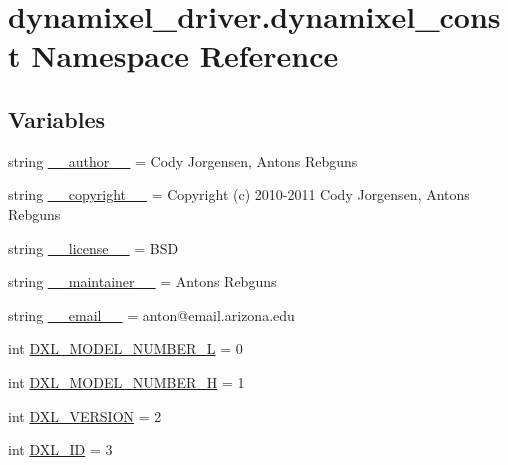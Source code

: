 \hypertarget{namespacedynamixel__driver_1_1dynamixel__const}{}\section{dynamixel\+\_\+driver.\+dynamixel\+\_\+const Namespace Reference}
\label{namespacedynamixel__driver_1_1dynamixel__const}
\subsection*{Variables}
\begin{DoxyCompactItemize}
\item 
string \hyperlink{namespacedynamixel__driver_1_1dynamixel__const_a47fdd52e119bdcded6911b8862d0012c}{\+\_\+\+\_\+author\+\_\+\+\_\+} = \textquotesingle{}Cody Jorgensen, Antons Rebguns\textquotesingle{}
\item 
string \hyperlink{namespacedynamixel__driver_1_1dynamixel__const_a718f3c8c96f877ba58f0163ccde92895}{\+\_\+\+\_\+copyright\+\_\+\+\_\+} = \textquotesingle{}Copyright (c) 2010-\/2011 Cody Jorgensen, Antons Rebguns\textquotesingle{}
\item 
string \hyperlink{namespacedynamixel__driver_1_1dynamixel__const_abbd78acca0a248fb8e01def1f20e3c3e}{\+\_\+\+\_\+license\+\_\+\+\_\+} = \textquotesingle{}B\+SD\textquotesingle{}
\item 
string \hyperlink{namespacedynamixel__driver_1_1dynamixel__const_a6084e7c7c40fbb4b74359b4c7af8bd27}{\+\_\+\+\_\+maintainer\+\_\+\+\_\+} = \textquotesingle{}Antons Rebguns\textquotesingle{}
\item 
string \hyperlink{namespacedynamixel__driver_1_1dynamixel__const_a3572d71e96dc853e7fa368551b4029e8}{\+\_\+\+\_\+email\+\_\+\+\_\+} = \textquotesingle{}anton@email.\+arizona.\+edu\textquotesingle{}
\item 
int \hyperlink{namespacedynamixel__driver_1_1dynamixel__const_a4b46eb7e85a85998cb70c562fd6ea731}{D\+X\+L\+\_\+\+M\+O\+D\+E\+L\+\_\+\+N\+U\+M\+B\+E\+R\+\_\+L} = 0
\item 
int \hyperlink{namespacedynamixel__driver_1_1dynamixel__const_a85cb75ba618884b455406ff25cb9d574}{D\+X\+L\+\_\+\+M\+O\+D\+E\+L\+\_\+\+N\+U\+M\+B\+E\+R\+\_\+H} = 1
\item 
int \hyperlink{namespacedynamixel__driver_1_1dynamixel__const_ad584bb8c75dfface744326e60242989d}{D\+X\+L\+\_\+\+V\+E\+R\+S\+I\+ON} = 2
\item 
int \hyperlink{namespacedynamixel__driver_1_1dynamixel__const_a2f478da6888ea724c59a00c2d2f77965}{D\+X\+L\+\_\+\+ID} = 3

\end{DoxyCompactItemize}
